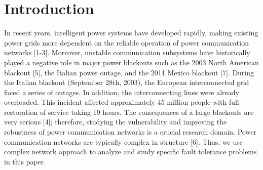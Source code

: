 \documentclass[AMA,STIX1COL]{WileyNJD-v2}
\begin{document}

\jnlcitation{}

\maketitle




\section{Introduction}\label{sec1}
\par In recent years, intelligent power systems have developed rapidly, making existing power grids more dependent on the reliable operation of power communication networks [1-3]. Moreover, unstable communication subsystems have historically played a negative role in major power blackouts such as the 2003 North American blackout [5], the Italian power outage, and the 2011 Mexico blackout [7]. During the Italian blackout (September 28th, 2003), the European interconnected grid faced a series of outages. In addition, the interconnecting lines were already overloaded. This incident affected approximately 45 million people with full restoration of service taking 19 hours. The consequences of a large blackouts are very serious [4]; therefore, studying the vulnerability and improving the robustness of power communication networks is a crucial research domain. Power communication networks are typically complex in structure [6]. Thus, we use complex network approach to analyze and study specific fault tolerance problems in this paper.
\end{document}
